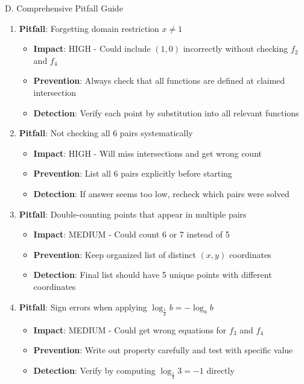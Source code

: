 \documentclass[12pt]{article}
\begin{document}
\begin{roadmapbox}{D. Comprehensive Pitfall Guide}
\begin{enumerate}[leftmargin=*]
    \item \textbf{Pitfall}: Forgetting domain restriction $x \neq 1$
    \begin{itemize}
        \item \textbf{Impact}: HIGH - Could include $(1, 0)$ incorrectly without checking $f_2$ and $f_4$
        \item \textbf{Prevention}: Always check that all functions are defined at claimed intersection
        \item \textbf{Detection}: Verify each point by substitution into all relevant functions
    \end{itemize}
    
    \item \textbf{Pitfall}: Not checking all 6 pairs systematically
    \begin{itemize}
        \item \textbf{Impact}: HIGH - Will miss intersections and get wrong count
        \item \textbf{Prevention}: List all 6 pairs explicitly before starting
        \item \textbf{Detection}: If answer seems too low, recheck which pairs were solved
    \end{itemize}
    
    \item \textbf{Pitfall}: Double-counting points that appear in multiple pairs
    \begin{itemize}
        \item \textbf{Impact}: MEDIUM - Could count 6 or 7 instead of 5
        \item \textbf{Prevention}: Keep organized list of distinct $(x, y)$ coordinates
        \item \textbf{Detection}: Final list should have 5 unique points with different coordinates
    \end{itemize}
    
    \item \textbf{Pitfall}: Sign errors when applying $\log_{\frac{1}{a}} b = -\log_a b$
    \begin{itemize}
        \item \textbf{Impact}: MEDIUM - Could get wrong equations for $f_3$ and $f_4$
        \item \textbf{Prevention}: Write out property carefully and test with specific value
        \item \textbf{Detection}: Verify by computing $\log_{\frac{1}{3}} 3 = -1$ directly
    \end{itemize}
    

\end{enumerate}
\end{roadmapbox}
\end{document}
